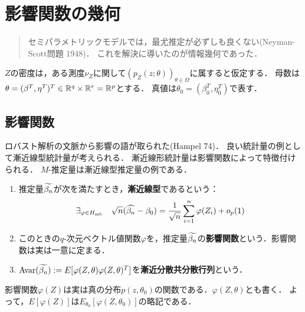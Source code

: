 \documentclass[uplatex,dvipdfmx]{jsreport}
\begin{document}
\chapter{影響関数の幾何}

\begin{quotation}
    セミパラメトリックモデルでは，最尤推定が必ずしも良くない(Neyman-Scott問題 1948)．
    これを解決に導いたのが情報幾何であった．
\end{quotation}

\begin{notation}
    $Z$の密度は，ある測度$\nu_Z$に関して$(p_Z(z;\theta))_{\theta\in\Omega}$に属すると仮定する．
    母数は$\theta=(\beta^T,\eta^T)^T\in\mathbb{R}^q\times\mathbb{R}^r=\mathbb{R}^p$とする．
    真値は$\theta_0=(\beta_0^T,\eta^T_0)$で表す．
\end{notation}

\section{影響関数}

\begin{tcolorbox}[colframe=ForestGreen, colback=ForestGreen!10!white,breakable,colbacktitle=ForestGreen!40!white,coltitle=black,fonttitle=\bfseries\sffamily,
title=]
    ロバスト解析の文脈から影響の語が取られた(Hampel 74)．
    良い統計量の例として漸近線型統計量が考えられる．
    漸近線形統計量は影響関数によって特徴付けられる．
    $M$-推定量は漸近線型推定量の例である．
\end{tcolorbox}

\begin{definition}\mbox{}
    \begin{enumerate}
        \item 推定量$\widetilde{\beta_n}$が次を満たすとき，\textbf{漸近線型}であるという：
        \[\exists_{\varphi\in H_{\mathrm{mb}}}\quad\sqrt{n}(\widehat{\beta_n}-\beta_0)=\frac{1}{\sqrt{n}}\sum^n_{i=1}\varphi(Z_i)+o_p(1)\]
        \item このときの$q$-次元ベクトル値関数$\varphi$を，推定量$\widetilde{\beta_n}$の\textbf{影響関数}という．影響関数は実は一意に定まる．
        \item $\mathrm{Avar}(\widetilde{\beta_n}):=E[\varphi(Z,\theta)\varphi(Z,\theta)^T]$を\textbf{漸近分散共分散行列}という．
    \end{enumerate}
\end{definition}
\begin{remark}
    影響関数$\varphi(Z)$は実は真の分布$p(z,\theta_0)$の関数である．$\varphi(Z,\theta)$とも書く．
    よって，$E[\varphi(Z)]$は$E_{\theta_0}[\varphi(Z,\theta_0)]$の略記である．
\end{remark}
\end{document}
